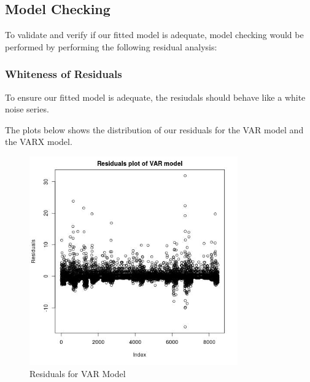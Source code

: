 \documentclass[10pt, letterpaper] {article}
\begin{document}
\subsection{Model Checking}
To validate and verify if our fitted model is adequate, model checking would be performed by performing the following residual analysis:


\subsubsection{Whiteness of Residuals}
To ensure our fitted model is adequate, the resiudals should behave like a white noise series. 

The plots below shows the distribution of our residuals for the VAR model and the VARX model. 

\begin{figure}[H]
    \centering
    \includegraphics[width=0.8\textwidth, height=0.4\textheight]{Images/VAR_resids.jpg}
    \caption{Residuals for VAR Model}
    \label{fig:Residuals for VAR Model}
\end{figure}
\end{document}
